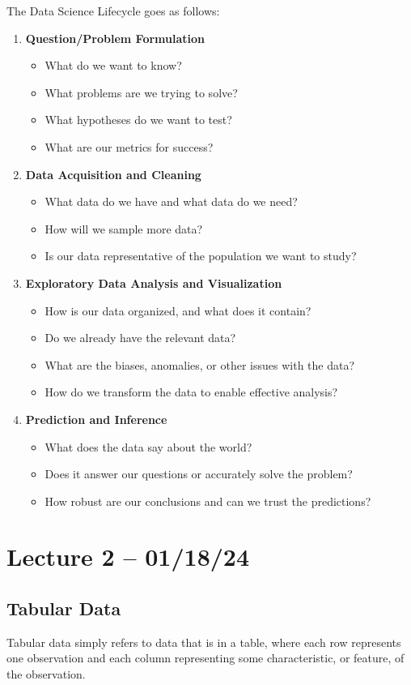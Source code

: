 \documentclass[openany]{book}
\begin{document}
The Data Science Lifecycle goes as follows:
\begin{enumerate}
	\item \textbf{Question/Problem Formulation}
	\begin{itemize}
		\item What do we want to know?
		\item What problems are we trying to solve?
		\item What hypotheses do we want to test?
		\item What are our metrics for success?
	\end{itemize}
	\item \textbf{Data Acquisition and Cleaning}
	\begin{itemize}
		\item What data do we have and what data do we need?
		\item How will we sample more data?
		\item Is our data representative of the population we want to study?
	\end{itemize}
	\item \textbf{Exploratory Data Analysis and Visualization}
	\begin{itemize}
		\item How is our data organized, and what does it contain?
		\item Do we already have the relevant data?
		\item What are the biases, anomalies, or other issues with the data?
		\item How do we transform the data to enable effective analysis?
	\end{itemize}
	\item \textbf{Prediction and Inference}
	\begin{itemize}
		\item What does the data say about the world?
		\item Does it answer our questions or accurately solve the problem?
		\item How robust are our conclusions and can we trust the predictions?
	\end{itemize}
\end{enumerate}

\section{Lecture 2 -- 01/18/24}
\subsection{Tabular Data}
Tabular data simply refers to data that is in a table, where each row represents one observation and each column representing some characteristic, or feature, of the observation.
\end{document}
